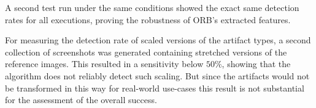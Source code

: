 A second test run under the same conditions showed the exact same detection rates for all executions, proving the robustness of ORB's extracted features.

For measuring the detection rate of scaled versions of the artifact types, a second collection of screenshots was generated containing stretched versions of the reference images. This resulted in a sensitivity below $50\%$, showing that the algorithm does not reliably detect such scaling. But since the artifacts would not be transformed in this way for real-world use-cases this result is not substantial for the assessment of the overall success.

\begin{figure}[h!]
	\centering
	\qquad
\end{figure}
